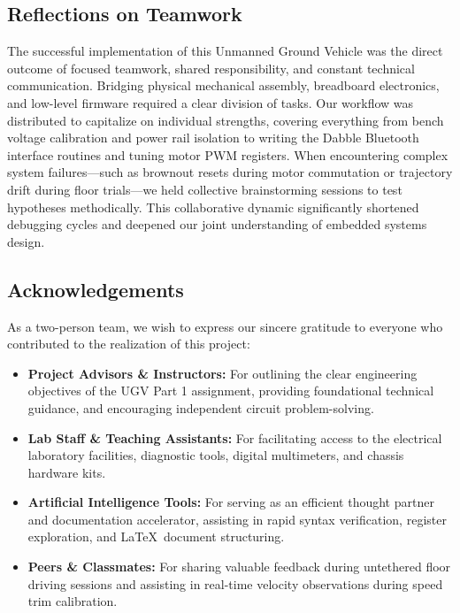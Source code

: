 \documentclass[journal,12pt,onecolumn]{IEEEtran}
\begin{document}
\subsection*{Reflections on Teamwork}
The successful implementation of this Unmanned Ground Vehicle was the direct outcome of focused teamwork, shared responsibility, and constant technical communication. %
Bridging physical mechanical assembly, breadboard electronics, and low-level firmware required a clear division of tasks. %
Our workflow was distributed to capitalize on individual strengths, covering everything from bench voltage calibration and power rail isolation to writing the Dabble Bluetooth interface routines and tuning motor PWM registers. %
When encountering complex system failures---such as brownout resets during motor commutation or trajectory drift during floor trials---we held collective brainstorming sessions to test hypotheses methodically. %
This collaborative dynamic significantly shortened debugging cycles and deepened our joint understanding of embedded systems design. %

\subsection*{Acknowledgements}
As a two-person team, we wish to express our sincere gratitude to everyone who contributed to the realization of this project: %
\begin{itemize}
	\item \textbf{Project Advisors \& Instructors:} For outlining the clear engineering objectives of the UGV Part 1 assignment, providing foundational technical guidance, and encouraging independent circuit problem-solving. %
	\item \textbf{Lab Staff \& Teaching Assistants:} For facilitating access to the electrical laboratory facilities, diagnostic tools, digital multimeters, and chassis hardware kits. %
	\item \textbf{Artificial Intelligence Tools:} For serving as an efficient thought partner and documentation accelerator, assisting in rapid syntax verification, register exploration, and \LaTeX\ document structuring. %
	\item \textbf{Peers \& Classmates:} For sharing valuable feedback during untethered floor driving sessions and assisting in real-time velocity observations during speed trim calibration. %
\end{itemize}
\end{document}
